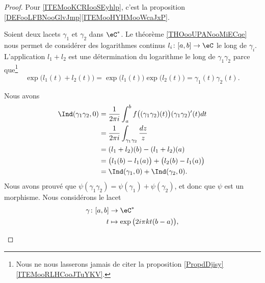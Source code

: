 \begin{proof}
    Pour \ref{ITEMooKCRIooSEyhlp}, c'est la proposition \ref{DEFooLFBNooGlvJmp}\ref{ITEMooHYHMooWcaJxP}. 

    Soient deux lacets \( \gamma_1\) et \( \gamma_2\) dans \( \eC^*\). Le théorème \ref{THOooUPANooMiECqe} nous permet de considérer des logarithmes continus \( l_i\colon \mathopen[ a , b \mathclose]\to \eC\) le long de \( \gamma_i\). L'application \( l_1+l_2\) est une détermination du logarithme le long de \( \gamma_1\gamma_2\) parce que\footnote{Nous ne nous lasserons jamais de citer la proposition \ref{PropdDjisy}\ref{ITEMooRLHCooJTuYKV}.}
    \begin{equation}
        \exp\big( l_1(t)+l_2(t) \big)=\exp\big( l_1(t) \big)\exp\big( l_2(t) \big)=\gamma_1(t)\gamma_2(t).
    \end{equation}
    \begin{subproof}
        \spitem[Morphisme]
        Nous avons
        \begin{subequations}
            \begin{align}
                \Ind(\gamma_1\gamma_2,0)&=\frac{1}{ 2\pi i }\int_a^bf\big( (\gamma_1\gamma_2)(t)\big)(\gamma_1\gamma_2)'(t)dt\\
                &=\frac{1}{ 2\pi i }\int_{\gamma_1\gamma_2}\frac{ dz }{ z }\\
                &=(l_1+l_2)(b)-(l_1+l_2)(a)\\
                &=\big( l_1(b)-l_1(a) \big)+\big( l_2(b)-l_1(a) \big)\\
                &=\Ind(\gamma_1,0)+\Ind(\gamma_2,0).
            \end{align}
        \end{subequations}
        Nous avons prouvé que \( \psi(\gamma_1\gamma_2)=\psi(\gamma_1)+\psi(\gamma_2)\), et donc que \( \psi\) est un morphisme.
        \spitem[Surjection]
        Nous considérons le lacet
        \begin{equation}
            \begin{aligned}
                \gamma\colon \mathopen[ a , b \mathclose]&\to \eC^* \\
                t&\mapsto \exp\big( 2i\pi kt(b-a) \big),
            \end{aligned}
        \end{equation}

\end{subproof}
\end{proof}
